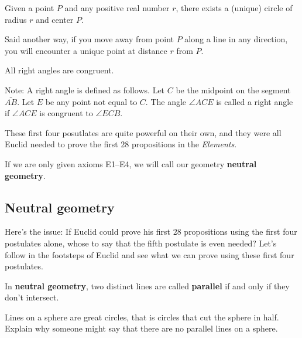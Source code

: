 \documentclass[instructornotes]{ximera}
\begin{document}
\begin{axiom}[E3]
Given a point $P$ and any positive real number $r$, there exists a
(unique) circle of radius $r$ and center $P$. 

Said another way, if you move away from point $P$ along a line in any
direction, you will encounter a unique point at distance $r$ from $P$.
\end{axiom}

\begin{axiom}[E4]
All right angles are congruent.

Note: A right angle is defined as follows. Let $C$ be the midpoint on
the segment $\bar{AB}$. Let $E$ be any point not equal to
$C$. The angle $\angle ACE$ is called a right angle if $\angle ACE$ is
congruent to $\angle ECB$. 
\end{axiom}

These first four posutlates are quite powerful on their own, and they
were all Euclid needed to prove the first $28$ propositions in the
\textit{Elements}.


\begin{definition}
If we are only given axioms E1--E4, we will call our geometry
\textbf{neutral geometry}.
\end{definition}





\subsection{Neutral geometry}


Here's the issue: If Euclid could prove his first $28$ propositions
using the first four postulates alone, whose to say that the fifth
postulate is even needed?  Let's follow in the footsteps of Euclid and
see what we can prove using these first four postulates.



\begin{definition}
In \textbf{neutral geometry}, two distinct lines are called \textbf{parallel} if and
only if they don't intersect.
\end{definition}



\begin{problem}
 Lines on a sphere are great circles, that is circles that cut the
 sphere in half. Explain why someone might say that there are no
 parallel lines on a sphere.
\end{problem}
   
\end{document}
